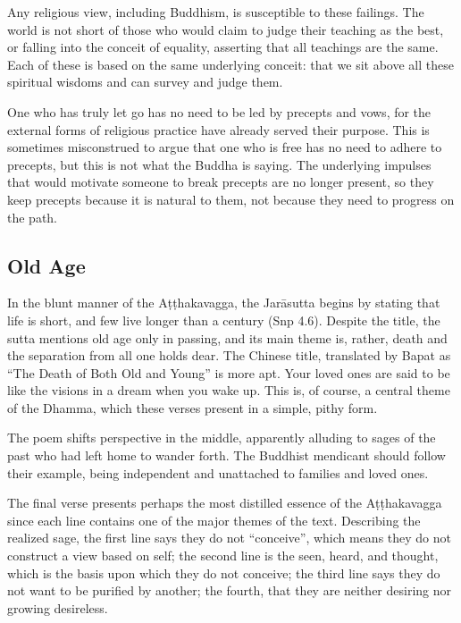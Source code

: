 \documentclass[12pt,openany]{book}%
\begin{document}
Any religious view, including Buddhism, is susceptible to these failings. The world is not short of those who would claim to judge their teaching as the best, or falling into the conceit of equality, asserting that all teachings are the same. Each of these is based on the same underlying conceit: that we sit above all these spiritual wisdoms and can survey and judge them.

One who has truly let go has no need to be led by precepts and vows, for the external forms of religious practice have already served their purpose. This is sometimes misconstrued to argue that one who is free has no need to adhere to precepts, but this is not what the Buddha is saying. The underlying impulses that would motivate someone to break precepts are no longer present, so they keep precepts because it is natural to them, not because they need to progress on the path.

\subsection*{Old Age}

In the blunt manner of the \textsanskrit{Aṭṭhakavagga}, the \textsanskrit{Jarāsutta} begins by stating that life is short, and few live longer than a century (Snp 4.6). Despite the title, the sutta mentions old age only in passing, and its main theme is, rather, death and the separation from all one holds dear. The Chinese title, translated by Bapat as “The Death of Both Old and Young” is more apt. Your loved ones are said to be like the visions in a dream when you wake up. This is, of course, a central theme of the Dhamma, which these verses present in a simple, pithy form.

The poem shifts perspective in the middle, apparently alluding to sages of the past who had left home to wander forth. The Buddhist mendicant should follow their example, being independent and unattached to families and loved ones.

The final verse presents perhaps the most distilled essence of the \textsanskrit{Aṭṭhakavagga} since each line contains one of the major themes of the text. Describing the realized sage, the first line says they do not “conceive”, which means they do not construct a view based on self; the second line is the seen, heard, and thought, which is the basis upon which they do not conceive; the third line says they do not want to be purified by another; the fourth, that they are neither desiring nor growing desireless.
\end{document}
